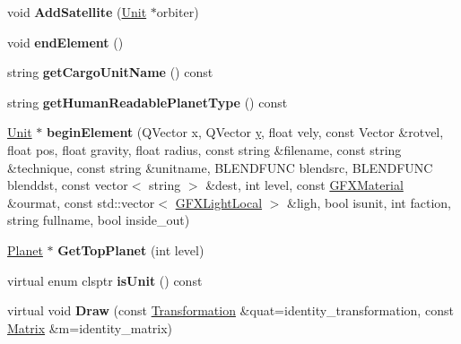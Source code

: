 \begin{DoxyCompactItemize}
\item 
void {\bfseries Add\+Satellite} (\hyperlink{classUnit}{Unit} $\ast$orbiter)\hypertarget{classPlanet_aa35ce2502cab794b921ee624f4fa6ae3}{}\label{classPlanet_aa35ce2502cab794b921ee624f4fa6ae3}

\item 
void {\bfseries end\+Element} ()\hypertarget{classPlanet_ae7d58eac4ae013cf2a88ffc8e04ab065}{}\label{classPlanet_ae7d58eac4ae013cf2a88ffc8e04ab065}

\item 
string {\bfseries get\+Cargo\+Unit\+Name} () const \hypertarget{classPlanet_aa96ab8323d1596503ecaae1f39f1b445}{}\label{classPlanet_aa96ab8323d1596503ecaae1f39f1b445}

\item 
string {\bfseries get\+Human\+Readable\+Planet\+Type} () const \hypertarget{classPlanet_ab735f0d9583d4fb854c3ada581755e24}{}\label{classPlanet_ab735f0d9583d4fb854c3ada581755e24}

\item 
\hyperlink{classUnit}{Unit} $\ast$ {\bfseries begin\+Element} (Q\+Vector x, Q\+Vector \hyperlink{IceUtils_8h_aa7ffaed69623192258fb8679569ff9ba}{y}, float vely, const Vector \&rotvel, float pos, float gravity, float radius, const string \&filename, const string \&technique, const string \&unitname, B\+L\+E\+N\+D\+F\+U\+NC blendsrc, B\+L\+E\+N\+D\+F\+U\+NC blenddst, const vector$<$ string $>$ \&dest, int level, const \hyperlink{structGFXMaterial}{G\+F\+X\+Material} \&ourmat, const std\+::vector$<$ \hyperlink{structGFXLightLocal}{G\+F\+X\+Light\+Local} $>$ \&ligh, bool isunit, int faction, string fullname, bool inside\+\_\+out)\hypertarget{classPlanet_a4c7e12332b0e4c00c5bd105857e534b0}{}\label{classPlanet_a4c7e12332b0e4c00c5bd105857e534b0}

\item 
\hyperlink{classPlanet}{Planet} $\ast$ {\bfseries Get\+Top\+Planet} (int level)\hypertarget{classPlanet_a91a03dd6d977773ca6c8b49c78ac980d}{}\label{classPlanet_a91a03dd6d977773ca6c8b49c78ac980d}

\item 
virtual enum clsptr {\bfseries is\+Unit} () const \hypertarget{classPlanet_ab3ad9c8a7654fcedcdcc09f78b44741e}{}\label{classPlanet_ab3ad9c8a7654fcedcdcc09f78b44741e}

\item 
virtual void {\bfseries Draw} (const \hyperlink{structTransformation}{Transformation} \&quat=identity\+\_\+transformation, const \hyperlink{classMatrix}{Matrix} \&m=identity\+\_\+matrix)\hypertarget{classPlanet_a4e5952e04e29f4b6f35b463e4580ebff}{}\label{classPlanet_a4e5952e04e29f4b6f35b463e4580ebff}


\end{DoxyCompactItemize}
